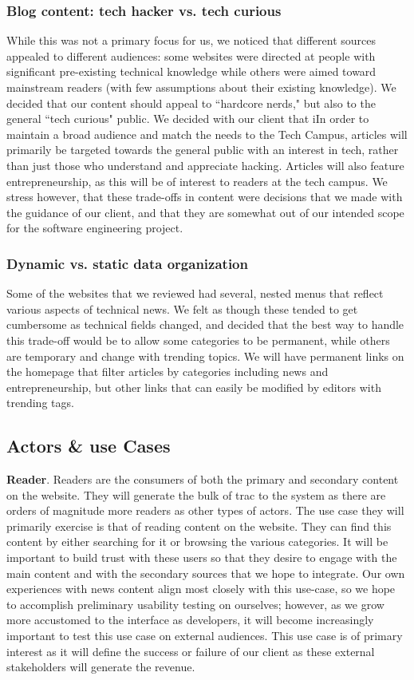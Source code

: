\documentclass[12pt]{article} %
\begin{document}
\subsubsection{Blog content: tech hacker vs. tech curious}
While this was not a primary focus for us, we noticed that different sources appealed to different audiences: some websites were directed at people with significant pre-existing technical knowledge while others were aimed toward mainstream readers (with few assumptions about their existing knowledge). We decided that our content should appeal to ``hardcore nerds," but also to the general ``tech curious" public. We decided with our client that iIn order to maintain a broad audience and match the needs to the Tech Campus, articles will primarily be targeted towards the general public with an interest in tech, rather than just those who understand and appreciate hacking. Articles will also feature entrepreneurship, as this will be of interest to readers at the tech campus. We stress however, that these trade-offs in content were decisions that we made with the guidance of our client, and that they are somewhat out of our intended scope for the software engineering project.

\subsubsection{Dynamic vs. static data organization}
Some of the websites that we reviewed had several, nested menus that reflect various aspects of technical news. We felt as though these tended to get cumbersome as technical fields changed, and decided that the best way to handle this trade-off would be to allow some categories to be permanent, while others are temporary and change with trending topics. We will have permanent links on the homepage that filter articles by categories including news and entrepreneurship, but other links that can easily be modified by editors with trending tags.

\subsection{Actors \& use Cases}

\textbf{Reader}. Readers are the consumers of both the primary and secondary content on the website. They will generate the bulk of trac to the system as there are orders of magnitude more readers as other types of actors. The use case they will primarily exercise is that of reading content on the website. They can find this content by either searching for it or browsing the various categories. It will be important to build trust with these users so that they desire to engage with the main content and with the secondary sources that we hope to integrate. Our own experiences with news content align most closely with this use-case, so we hope to accomplish preliminary usability testing on ourselves; however, as we grow more accustomed to the interface as developers, it will become increasingly important to test this use case on external audiences. This use case is of primary interest as it will define the success or failure of our client as these external stakeholders will generate the revenue.
                   
\end{document}
